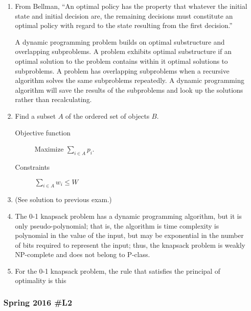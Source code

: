 \begin{enumerate}
	\item From Bellman, ``An optimal policy has the property that whatever the initial state and initial decision are, the remaining decisions must constitute an optimal policy with regard to the state resulting from the first decision.''
	
	A dynamic programming problem builds on optimal substructure and overlapping subproblems.  A problem exhibits optimal substructure if an optimal solution to the problem contains within it optimal solutions to subproblems.  A problem has overlapping subproblems when a recursive algorithm solves the same subproblems repeatedly.  A dynamic programming algorithm will save the results of the subproblems and look up the solutions rather than recalculating.  
	
	\item Find a subset $A$ of the ordered set of objects $B$.
	
	\begin{description}
		\item [Objective function]  Maximize $\displaystyle\sum_{i \in A} p_i$.  
		\item [Constraints] $\displaystyle \sum_{i \in A} w_i \le W$
		
	\end{description}
	
	\item (See solution to previous exam.)
	
	\item The 0-1 knapsack problem has a dynamic programming algorithm, but it is only pseudo-polynomial; that is, the algorithm is time complexity is polynomial in the value of the input, but may be exponential in the number of bits required to represent the input; thus, the knapsack problem is weakly NP-complete and does not belong to P-class.  
	
	\item For the 0-1 knapsack problem, the rule that satisfies the principal of optimality is this 
	
\end{enumerate}

\subsubsection{Spring 2016 \#L2}

